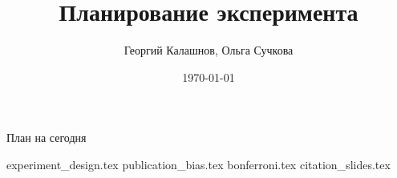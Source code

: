 \title{Планирование эксперимента}
\author[Георгий Калашнов, Ольга Сучкова]{Георгий Калашнов, Ольга Сучкова}
\date{\today}



\begin{frame}
  \titlepage
\end{frame}


\begin{frame}{План на сегодня} 
\tableofcontents
\end{frame}


{experiment_design.tex}
{publication_bias.tex}
{bonferroni.tex}
{citation_slides.tex}



